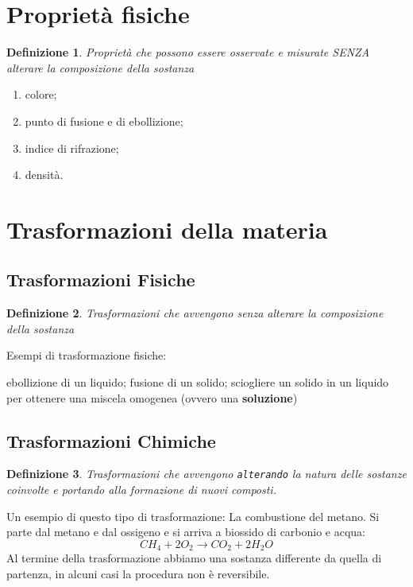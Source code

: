 \documentclass{book}
\newtheorem{definizione}{Definizione}
\begin{document}
\section{Proprietà fisiche}
\begin{definizione} 
	Proprietà che possono essere osservate e misurate SENZA alterare la composizione della sostanza
\end{definizione}
\begin{enumerate}
	\item colore;
	\item punto di fusione e di ebollizione;
	\item indice di rifrazione;
	\item densità.
\end{enumerate}
\section{Trasformazioni della materia}
\subsection{Trasformazioni Fisiche}
\begin{definizione}
	Trasformazioni che avvengono senza alterare la composizione della sostanza
\end{definizione}
Esempi di trasformazione fisiche:
\begin{tasks}{2}
	\task ebollizione di un liquido;
	\task fusione di un solido;
	\task sciogliere un solido in un liquido per ottenere una miscela omogenea (ovvero una \textbf{soluzione})
\end{tasks}
\subsection{Trasformazioni Chimiche}
\begin{definizione}
	Trasformazioni che avvengono \texttt{alterando} la natura delle sostanze coinvolte e portando alla formazione di nuovi composti.
\end{definizione}
Un esempio di questo tipo di trasformazione: La combustione del metano. Si parte dal metano e dal ossigeno e si arriva a biossido di carbonio e acqua:
\begin{equation*}
	CH_4+ 2O_2\to CO_2+2H_2O
\end{equation*}
Al termine della trasformazione abbiamo una sostanza differente da quella di partenza, in alcuni casi la procedura non è reversibile.
\end{document}

